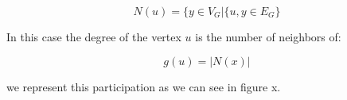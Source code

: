 \begin{equation}\label{eq:centerM}
\displaystyle N(u)={\{y\in V_{G}|\{u,y}\in E_{G}\}
\end{equation}

In this case the degree of the vertex $u$ is the number of neighbors of: 

\begin{equation}\label{eq:centerM}
\displaystyle g(u)=|N(x)|
\end{equation}

we represent this participation as we can see in figure x.









